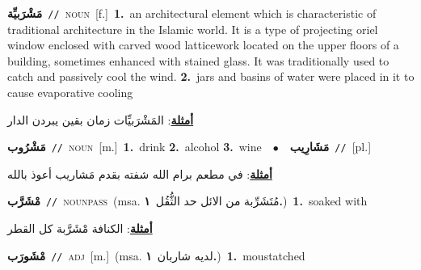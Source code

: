\documentclass[10pt,a4paper,twoside]{article} %
\begin{document}
\begin{multicols}{2}
{\setlength\topsep{0pt}\textbf{\foreignlanguage{arabic}{مَشْرَبيِّة}}\ {\color{gray}\texttt{//}\color{black}}\ \textsc{noun}\ [f.]\ \textbf{1.}~an architectural element which is characteristic of traditional architecture in the Islamic world. It is a type of projecting oriel window enclosed with carved wood latticework located on the upper floors of a building, sometimes enhanced with stained glass. It was traditionally used to catch and passively cool the wind.  \textbf{2.}~jars and basins of water were placed in it to cause evaporative cooling\  \begin{flushright}\color{gray}\foreignlanguage{arabic}{\textbf{\underline{\foreignlanguage{arabic}{أمثلة}}}: المَشْرَبيِّات زمان بقين يبردن الدار}\end{flushright}\color{black}} \vspace{2mm}

{\setlength\topsep{0pt}\textbf{\foreignlanguage{arabic}{مَشْرُوب}}\ {\color{gray}\texttt{//}\color{black}}\ \textsc{noun}\ [m.]\ \textbf{1.}~drink  \textbf{2.}~alcohol  \textbf{3.}~wine\ \ $\bullet$\ \ \setlength\topsep{0pt}\textbf{\foreignlanguage{arabic}{مَشَارِيب}}\ {\color{gray}\texttt{//}\color{black}}\ [pl.]\  \begin{flushright}\color{gray}\foreignlanguage{arabic}{\textbf{\underline{\foreignlanguage{arabic}{أمثلة}}}: في مطعم برام الله شفته بقدم مَشاريب أعوذ بالله}\end{flushright}\color{black}} \vspace{2mm}

{\setlength\topsep{0pt}\textbf{\foreignlanguage{arabic}{مْشَرَّب}}\ {\color{gray}\texttt{//}\color{black}}\ \textsc{noun\textunderscore pass}\ \color{gray}(msa. \foreignlanguage{arabic}{مُتَشَرِّبة من الائل حد الثُّقُل}~\foreignlanguage{arabic}{\textbf{١.}})\color{black}\ \textbf{1.}~soaked with\  \begin{flushright}\color{gray}\foreignlanguage{arabic}{\textbf{\underline{\foreignlanguage{arabic}{أمثلة}}}: الكنافة مْشَرَّبة كل القطر}\end{flushright}\color{black}} \vspace{2mm}

{\setlength\topsep{0pt}\textbf{\foreignlanguage{arabic}{مْشَورَب}}\ {\color{gray}\texttt{//}\color{black}}\ \textsc{adj}\ [m.]\ \color{gray}(msa. \foreignlanguage{arabic}{لديه شاربان}~\foreignlanguage{arabic}{\textbf{١.}})\color{black}\ \textbf{1.}~moustatched\ } \vspace{2mm}


\end{multicols}
\end{document}
